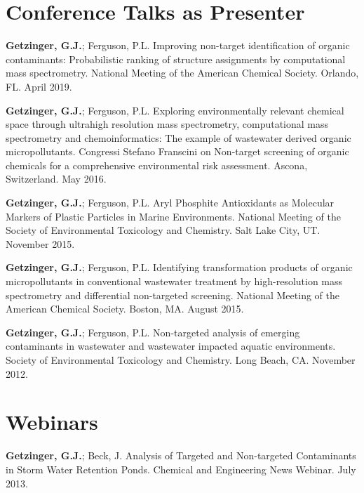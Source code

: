 \documentclass[letterpaper,10pt]{article}
\begin{document}
\section{Conference Talks as Presenter}
\begin{etaremune}
	\item{{\bfseries Getzinger, G.J.}}; Ferguson, P.L.  Improving non-target identification of organic contaminants: Probabilistic ranking of structure assignments by computational mass spectrometry. National Meeting of the American Chemical Society. Orlando, FL. April 2019.
	\item{{\bfseries Getzinger, G.J.}}; Ferguson, P.L. Exploring environmentally relevant chemical space through ultrahigh resolution mass spectrometry, computational mass spectrometry and chemoinformatics: The example of wastewater derived organic micropollutants. Congressi Stefano Franscini on Non-target screening of organic chemicals for a comprehensive environmental risk assessment. Ascona, Switzerland. May 2016. 
	\item{{\bfseries Getzinger, G.J.}}; Ferguson, P.L. Aryl Phosphite Antioxidants as Molecular Markers of Plastic Particles in Marine Environments. National Meeting of the Society of Environmental Toxicology and Chemistry. Salt Lake City, UT. November 2015.
	\item{{\bfseries Getzinger, G.J.}}; Ferguson, P.L. Identifying transformation products of organic micropollutants in conventional wastewater treatment by high-resolution mass spectrometry and differential non-targeted screening. National Meeting of the American Chemical Society. Boston, MA. August 2015.
	\item {\bfseries Getzinger, G.J.}; Ferguson, P.L. Non-targeted analysis of emerging contaminants in wastewater and wastewater impacted aquatic environments. Society of Environmental Toxicology and Chemistry. Long Beach, CA.  November 2012. 
\end{etaremune}
%
\section{Webinars}
\begin{etaremune}
\item {\bfseries Getzinger, G.J.}; Beck, J. Analysis of Targeted and Non-targeted Contaminants in Storm Water Retention Ponds. Chemical and Engineering News Webinar. July 2013.
\end{etaremune}
%
\end{document}
